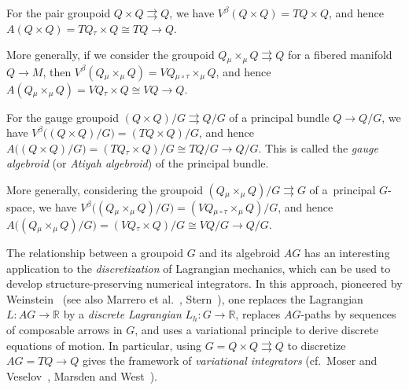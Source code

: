 \documentclass[10pt,a4paper]{amsart}
\numberwithin{equation}{section}
\begin{document}
\begin{Example} \label{ex:verticalAlgebroid} For the pair groupoid $ Q \times Q \rightrightarrows Q $, we have $ V ^\beta ( Q \times Q ) = T Q \times Q $, and hence $ A ( Q \times Q ) = T Q \mathbin{ _\tau \times } Q \cong T Q \rightarrow Q $.

More generally, if we consider the groupoid $ Q \mathbin{ _\mu \times _\mu } Q \rightrightarrows Q $ for a f\/ibered manifold $ Q \rightarrow M $, then $ V ^\beta ( Q \mathbin{ _\mu \times _\mu } Q ) = V Q \mathbin{ _{\mu \circ \tau } \times _\mu } Q $, and hence $ A ( Q \mathbin{ _\mu \times _\mu } Q ) = V Q \mathbin{ _\tau \times } Q \cong V Q \rightarrow Q $.
\end{Example}

\begin{Example} \label{ex:gaugeAlgebroid}
For the gauge groupoid $ ( Q \times Q ) / G \rightrightarrows Q / G $ of a principal bundle $ Q \rightarrow Q / G $, we have $ V ^\beta \bigl( ( Q \times Q ) / G \bigr) = (T Q \times Q) / G $, and hence $ A \bigl( ( Q \times Q ) / G \bigr) = ( T Q \mathbin{ _\tau \times } Q ) / G \cong T Q / G \rightarrow Q / G $. This is called the \emph{gauge algebroid} (or \emph{Atiyah algebroid}) of the principal bundle.

More generally, considering the groupoid $ (Q \mathbin{ _\mu \times _\mu } Q) / G \rightrightarrows G $ of a~principal $G$-space, we have $ V ^\beta \bigl( (Q \mathbin{ _\mu \times _\mu } Q) / G \bigr) = ( V Q \mathbin{ _{ \mu \circ \tau } \times _\mu } Q ) / G $, and hence $ A \bigl( (Q \mathbin{ _\mu \times _\mu } Q) / G \bigr) = ( V Q \mathbin{ _\tau \times } Q ) / G \cong V Q / G \rightarrow Q / G $.
\end{Example}

\begin{Remark} The relationship between a groupoid $G$ and its algebroid $ A G $ has an interesting application to the \emph{discretization} of Lagrangian mechanics, which can be used to develop structure-preserving numerical integrators. In this approach, pioneered by Weinstein~\cite{Weinstein1996} (see also Marrero et al.~\cite{MaMaMa2006,MaMaSt2015}, Stern~\cite{Stern2010}), one replaces the Lagrangian $ L \colon A G \rightarrow \mathbb{R} $ by a \emph{discrete Lagrangian} $ L _h \colon G \rightarrow \mathbb{R} $, replaces $AG$-paths by sequences of composable arrows in $G$, and uses a variational principle to derive discrete equations of motion. In particular, using $ G = Q \times Q \rightrightarrows Q $
to discretize $ A G = T Q \rightarrow Q $ gives the framework of \emph{variational integrators} (cf.\ Moser and Veselov~\cite{MoVe1991}, Marsden and West~\cite{MaWe2001}).
\end{Remark}
\end{document}
